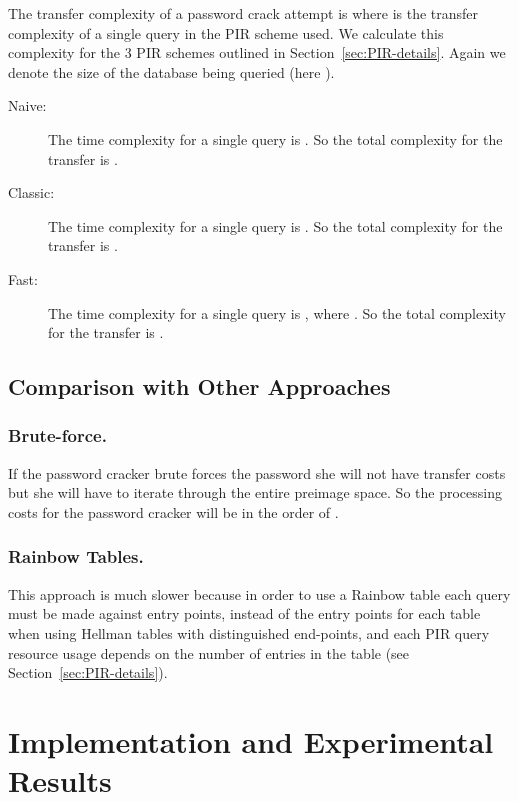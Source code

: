 \documentclass{llncs}
\begin{document}
The transfer complexity of a password crack attempt is 
where  is the transfer complexity of a single query in the
PIR scheme used. We calculate this complexity for the 3 PIR schemes
outlined in Section~\ref{sec:PIR-details}.
Again we denote  the size of the database being queried (here ).
\begin{description}
\item [{Naive:}] The time complexity for a single query is . 
So the total complexity for the transfer is .
\item [{Classic:}] The time complexity for a single query is .
So the total complexity for the transfer is .
\item [{Fast:}] The time complexity for a single query is ,
where . So the total complexity for the
transfer is .
\end{description}






\subsection{Comparison with Other Approaches} \label{sec:comparison}


\subsubsection{Brute-force.}

If the password cracker brute forces the password she will not have
transfer costs but she will have to iterate through the entire preimage
space. So the processing costs for the password cracker will be in
the order of .


\subsubsection{Rainbow Tables.}

This approach is much slower because in order to use a Rainbow table
each query must be made against  entry points, instead of
the  entry points for each table when using Hellman tables with
distinguished end-points, and each PIR query resource usage depends
on the number of entries in the table (see Section~\ref{sec:PIR-details}).



\section{Implementation and Experimental Results}
\label{sec:experimental-results}
\end{document}
